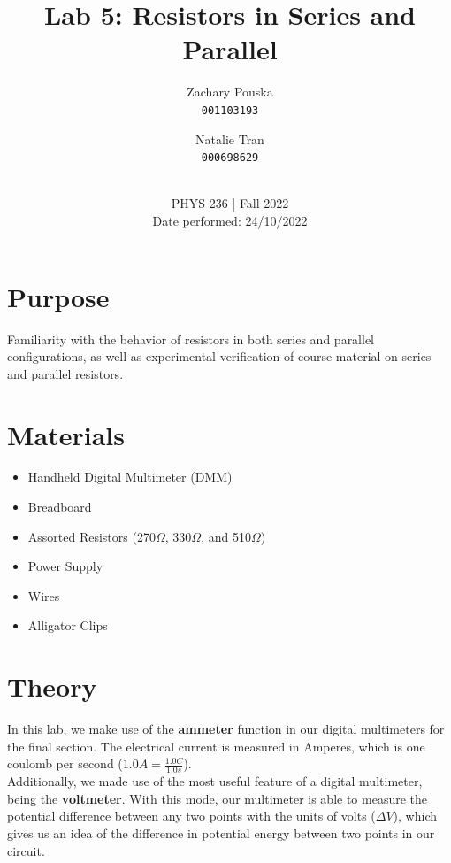 \documentclass[titlepage]{article}
\begin{document}
\title{\textbf{Lab 5: Resistors in Series and Parallel}}
\author{
    Zachary Pouska\\
    \texttt{001103193}\\
    \and
    Natalie Tran \\ 
    \texttt{000698629}\\ \\
} 

\date{PHYS 236 | Fall 2022\\
Date performed: 24/10/2022}


	\maketitle


	\section{Purpose}
    Familiarity with the behavior of resistors in both series and parallel configurations, as well as experimental verification of course material on series and parallel resistors. 

    \section{Materials} 
    \begin{itemize}
        \item Handheld Digital Multimeter (DMM)
        \item Breadboard
        \item Assorted Resistors (270$\Omega$, 330$\Omega$, and 510$\Omega$)
        \item Power Supply
        \item Wires
        \item Alligator Clips
    \end{itemize}


	\section{Theory}	
    In this lab, we make use of the \textbf{ammeter} function in our digital multimeters for the final section. The electrical current is measured in Amperes, which is one coulomb per second ($1.0 A = \frac{1.0C}{1.0 s}$).\\
    \vspace{5pt}
    Additionally, we made use of the most useful feature of a digital multimeter, being the \textbf{voltmeter}. With this mode, our multimeter is able to measure the potential difference between any two points with the units of volts ($\Delta V$), which gives us an idea of the difference in potential energy between two points in our circuit.\\ 
    \vspace{5pt}
\end{document}
